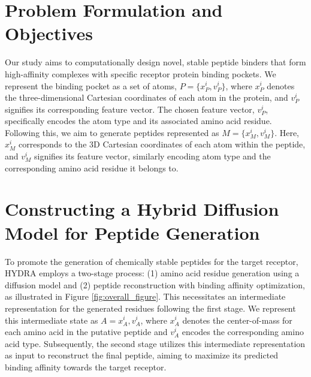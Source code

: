 \section{Problem Formulation and Objectives} 
Our study aims to computationally design novel, stable peptide binders that form high-affinity complexes with specific receptor protein binding pockets.
We represent the binding pocket as a set of atoms, $P = \{x_P^i, v_P^i\}$, where $x_P^i$ denotes the three-dimensional Cartesian coordinates of each atom in the protein, and $v_P^i$ signifies its corresponding feature vector. The chosen feature vector, $v_P^i$, specifically encodes the atom type and its associated amino acid residue. Following this, we aim to generate peptides represented as $M = \{x_M^i, v_M^i\}$. Here, $x_M^i$ corresponds to the 3D Cartesian coordinates of each atom within the peptide, and $v_M^i$ signifies its feature vector, similarly encoding atom type and the corresponding amino acid residue it belongs to.

\section{Constructing a Hybrid Diffusion Model for Peptide Generation}
To promote the generation of chemically stable peptides for the target receptor, HYDRA employs a two-stage process: (1) amino acid residue generation using a diffusion model and (2) peptide reconstruction with binding affinity optimization, as illustrated in Figure \ref{fig:overall_figure}. This necessitates an intermediate representation for the generated residues following the first stage. We represent this intermediate state as $A = {x_A^i, v_A^i}$, where $x_A^i$ denotes the center-of-mass for each amino acid in the putative peptide and $v_A^i$ encodes the corresponding amino acid type. Subsequently, the second stage utilizes this intermediate representation as input to reconstruct the final peptide, aiming to maximize its predicted binding affinity towards the target receptor.

